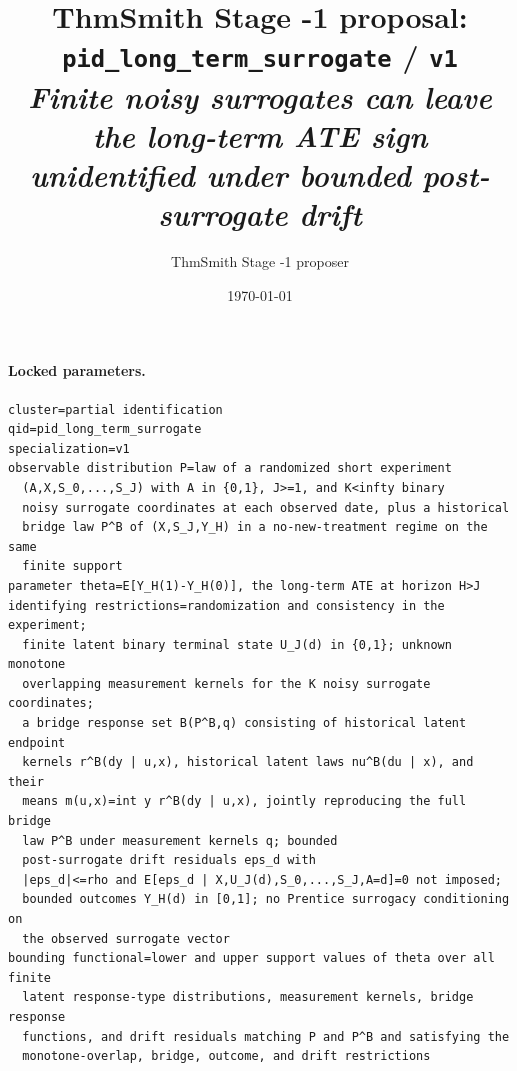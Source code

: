 \documentclass[11pt]{article}
\title{ThmSmith Stage -1 proposal: \texttt{pid\_long\_term\_surrogate} / \texttt{v1}%
  \\ \large\textit{Finite noisy surrogates can leave the long-term ATE sign unidentified under bounded post-surrogate drift}}
\author{ThmSmith Stage -1 proposer}
\date{\today}
\theoremstyle{definition}
\theoremstyle{plain}
\theoremstyle{remark}
\begin{document}
\maketitle


\paragraph{Locked parameters.}
\begin{verbatim}
cluster=partial identification
qid=pid_long_term_surrogate
specialization=v1
observable distribution P=law of a randomized short experiment
  (A,X,S_0,...,S_J) with A in {0,1}, J>=1, and K<infty binary
  noisy surrogate coordinates at each observed date, plus a historical
  bridge law P^B of (X,S_J,Y_H) in a no-new-treatment regime on the same
  finite support
parameter theta=E[Y_H(1)-Y_H(0)], the long-term ATE at horizon H>J
identifying restrictions=randomization and consistency in the experiment;
  finite latent binary terminal state U_J(d) in {0,1}; unknown monotone
  overlapping measurement kernels for the K noisy surrogate coordinates;
  a bridge response set B(P^B,q) consisting of historical latent endpoint
  kernels r^B(dy | u,x), historical latent laws nu^B(du | x), and their
  means m(u,x)=int y r^B(dy | u,x), jointly reproducing the full bridge
  law P^B under measurement kernels q; bounded
  post-surrogate drift residuals eps_d with
  |eps_d|<=rho and E[eps_d | X,U_J(d),S_0,...,S_J,A=d]=0 not imposed;
  bounded outcomes Y_H(d) in [0,1]; no Prentice surrogacy conditioning on
  the observed surrogate vector
bounding functional=lower and upper support values of theta over all finite
  latent response-type distributions, measurement kernels, bridge response
  functions, and drift residuals matching P and P^B and satisfying the
  monotone-overlap, bridge, outcome, and drift restrictions
\end{verbatim}
\end{document}
